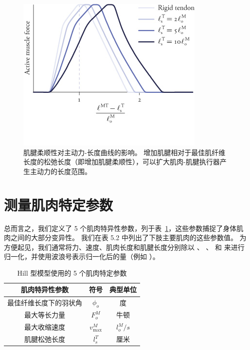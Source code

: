 \begin{figure}[!htb]
	\centering
	\includegraphics[width=0.6\linewidth]{chap5/5_9}
	\caption{肌腱柔顺性对主动力-长度曲线的影响。
		增加肌腱相对于最佳肌纤维长度的松弛长度（即增加肌腱柔顺性），可以扩大肌肉-肌腱执行器产生主动力的长度范围。 \label{fig:5_9}}
\end{figure}



\section{测量肌肉特定参数}

总而言之，我们定义了 5 个肌肉特异性参数，列于表~\ref{tab:5_1}，这些参数捕捉了身体肌肉之间的大部分变异性。
我们在表 5.2 中列出了下肢主要肌肉的这些参数值。
为方便起见，我们通常将力、速度、肌肉长度和肌腱长度分别除以 、 、 和 来进行归一化，并使用波浪号表示归一化后的量（例如 ）。


\begin{table}[htbp]
	\caption{Hill 型模型使用的 5 个肌肉特定参数} \label{tab:5_1} \centering
	\begin{tabular}{ccc} %
		\toprule
		肌肉特异性参数 & 符号 & 典型单位  \\
		\midrule
		最佳纤维长度下的羽状角 & $\phi_o$ &  度 \\
		\midrule
		最大等长力量 & $F_o^M$ &  牛顿 \\
		\midrule
		最大收缩速度 & $v_\text{max}^M$ &  $l_o^M / s$ \\
		\midrule
		肌腱松弛长度 & $l_s^T$ &  厘米 \\
		\bottomrule
	\end{tabular}
\end{table}


